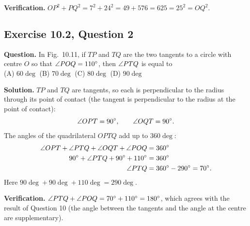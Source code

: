 \textbf{Verification.} $OP^2+PQ^2=7^2+24^2=49+576=625=25^2=OQ^2$.


\subsection*{Exercise 10.2, Question 2}
\textbf{Question.} In Fig.\ 10.11, if $TP$ and $TQ$ are the two tangents to a circle with centre $O$ so that $\angle POQ=110^\circ$, then $\angle PTQ$ is equal to\\
(A) $60\deg$ \qquad (B) $70\deg$ \qquad (C) $80\deg$ \qquad (D) $90\deg$

\begin{center}
%
\end{center}

\textbf{Solution.} $TP$ and $TQ$ are tangents, so each is perpendicular to the radius through its point of contact (the tangent is perpendicular to the radius at the point of contact):
\[\angle OPT=90^\circ,\qquad \angle OQT=90^\circ.\]
The angles of the quadrilateral $OPTQ$ add up to $360\deg$:
\begin{align*}
\angle OPT+\angle PTQ+\angle OQT+\angle POQ&=360^\circ\\
90^\circ+\angle PTQ+90^\circ+110^\circ&=360^\circ\\
\angle PTQ&=360^\circ-290^\circ=70^\circ.
\end{align*}
Here $90\deg+90\deg+110\deg=290\deg$.

\textbf{Verification.} $\angle PTQ+\angle POQ=70^\circ+110^\circ=180^\circ$, which agrees with the result of Question 10 (the angle between the tangents and the angle at the centre are supplementary).

